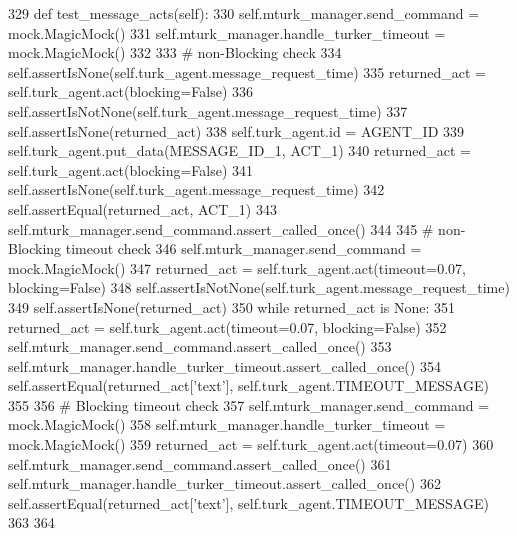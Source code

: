 \begin{DoxyCode}
329     \textcolor{keyword}{def }test\_message\_acts(self):
330         self.mturk\_manager.send\_command = mock.MagicMock()
331         self.mturk\_manager.handle\_turker\_timeout = mock.MagicMock()
332 
333         \textcolor{comment}{# non-Blocking check}
334         self.assertIsNone(self.turk\_agent.message\_request\_time)
335         returned\_act = self.turk\_agent.act(blocking=\textcolor{keyword}{False})
336         self.assertIsNotNone(self.turk\_agent.message\_request\_time)
337         self.assertIsNone(returned\_act)
338         self.turk\_agent.id = AGENT\_ID
339         self.turk\_agent.put\_data(MESSAGE\_ID\_1, ACT\_1)
340         returned\_act = self.turk\_agent.act(blocking=\textcolor{keyword}{False})
341         self.assertIsNone(self.turk\_agent.message\_request\_time)
342         self.assertEqual(returned\_act, ACT\_1)
343         self.mturk\_manager.send\_command.assert\_called\_once()
344 
345         \textcolor{comment}{# non-Blocking timeout check}
346         self.mturk\_manager.send\_command = mock.MagicMock()
347         returned\_act = self.turk\_agent.act(timeout=0.07, blocking=\textcolor{keyword}{False})
348         self.assertIsNotNone(self.turk\_agent.message\_request\_time)
349         self.assertIsNone(returned\_act)
350         \textcolor{keywordflow}{while} returned\_act \textcolor{keywordflow}{is} \textcolor{keywordtype}{None}:
351             returned\_act = self.turk\_agent.act(timeout=0.07, blocking=\textcolor{keyword}{False})
352         self.mturk\_manager.send\_command.assert\_called\_once()
353         self.mturk\_manager.handle\_turker\_timeout.assert\_called\_once()
354         self.assertEqual(returned\_act[\textcolor{stringliteral}{'text'}], self.turk\_agent.TIMEOUT\_MESSAGE)
355 
356         \textcolor{comment}{# Blocking timeout check}
357         self.mturk\_manager.send\_command = mock.MagicMock()
358         self.mturk\_manager.handle\_turker\_timeout = mock.MagicMock()
359         returned\_act = self.turk\_agent.act(timeout=0.07)
360         self.mturk\_manager.send\_command.assert\_called\_once()
361         self.mturk\_manager.handle\_turker\_timeout.assert\_called\_once()
362         self.assertEqual(returned\_act[\textcolor{stringliteral}{'text'}], self.turk\_agent.TIMEOUT\_MESSAGE)
363 
364 
\end{DoxyCode}
\mbox{\label{classparlai_1_1mturk_1_1core_1_1test_1_1test__mturk__agent_1_1TestMTurkAgent_aede39316eac85bcec9ad3604e6e590fe}} 
